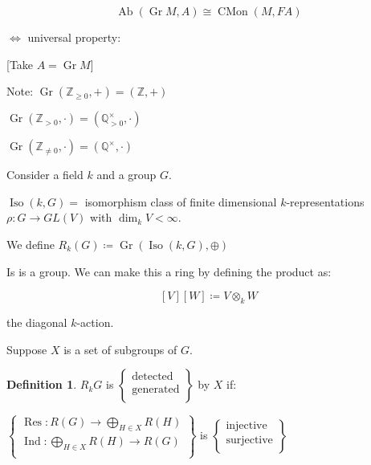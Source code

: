 \documentclass{article}
\theoremstyle{definition}
\newtheorem*{definition}{Definition}
\begin{document}
\[
    \operatorname{Ab} (\operatorname{Gr} M, A) \cong \operatorname{CMon} (M, FA)
\]

\(\iff \) universal property:

\begin{center}
\end{center}

[Take \(A = \operatorname{Gr} M\)]

Note: \(\operatorname{Gr} (\mathbb{Z}_{\geq 0}, +) = (\mathbb{Z} , +)\) 

\(\operatorname{Gr} (\mathbb{Z}_{>0}, \cdot) = (\mathbb{Q}^\times_{>0} , \cdot)\) 

\(\operatorname{Gr}(\mathbb{Z}_{\neq 0}, \cdot) = (\mathbb{Q}^\times, \cdot)\) 

Consider a field \(k\) and a group \(G\).

\(\operatorname{Iso} (k,G) =\) isomorphism class of finite dimensional \(k\)-representations \(\rho : G \to GL(V)\) with \(\dim_k V < \infty\).

We define \(R_k(G) \coloneqq \operatorname{Gr}(\operatorname{Iso}(k,G), \oplus)\) 

Is is a group. We can make this a ring by defining the product as:

\[
    [V][W] \coloneqq V \otimes_k W
\]

the diagonal \(k\)-action.


Suppose \(X\) is a set of subgroups of \(G\).

\begin{definition}
    \(R_k G\) is \(\begin{Bmatrix}
         \text{detected} \\
         \text{generated} \\
    \end{Bmatrix}\) by \(X\) if:
    
    \(\begin{Bmatrix}
         \operatorname{Res}: R(G) \to \bigoplus_{H\in X} R(H) \\
         \operatorname{Ind} : \bigoplus_{H\in X} R(H) \to R(G) \\
    \end{Bmatrix}\) is \(\begin{Bmatrix}
         \text{injective} \\
         \text{surjective} \\
    \end{Bmatrix}\)   
\end{definition}
\end{document}
